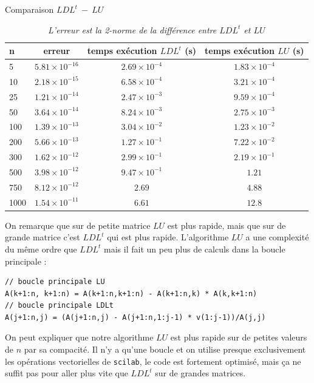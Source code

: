 \documentclass{article}
\begin{document}
\begin{table}[H]
\centering
\renewcommand*\arraystretch{1.3}
\caption{Comparaison \(LDL^t\ -\ LU\)}
\begin{tabular}{|l|c|c|c|}
  \hline
  n & erreur & temps exécution \(LDL^t\) (s) & temps exécution \(LU\) (s) \\
  \hline
	5	&	\(5.81 \times 10^{-16}\)	&	\(2.69 \times 10^{-4}\)	&	\(1.83 \times 10^{-4}\) \\
	10	&	\(2.18 \times 10^{-15}\)	&	\(6.58 \times 10^{-4}\)	&	\(3.21 \times 10^{-4}\) \\
	25	&	\(1.21 \times 10^{-14}\)	&	\(2.47 \times 10^{-3}\)	&	\(9.59 \times 10^{-4}\) \\
	50	&	\(3.64 \times 10^{-14}\)	&	\(8.24 \times 10^{-3}\)	&	\(2.75 \times 10^{-3}\) \\
	100	&	\(1.39 \times 10^{-13}\)	&	\(3.04 \times 10^{-2}\)	&	\(1.23 \times 10^{-2}\) \\
	200	&	\(5.66 \times 10^{-13}\)	&	\(1.27 \times 10^{-1}\)	&	\(7.22 \times 10^{-2}\) \\
	300	&	\(1.62 \times 10^{-12}\)	&	\(2.99 \times 10^{-1}\)	&	\(2.19 \times 10^{-1}\) \\
	500	&	\(3.98 \times 10^{-12}\)	&	\(9.47 \times 10^{-1}\)	&	\(1.21\) \\
	750	&	\(8.12 \times 10^{-12}\)	&	\(2.69\)				&	\(4.88\) \\
	1000 &	\(1.54 \times 10^{-11}\)	&	\(6.61\) 				&	\(12.8\) \\
  \hline
\end{tabular}
\caption*{\textit{L'erreur est la 2-norme de la différence entre \(LDL^t\) et \(LU\)}}
\end{table}

On remarque que sur de petite matrice \(LU\) est plus rapide, mais que sur de grande matrice c'est \(LDL^t\) qui est plus rapide. L'algorithme \(LU\) a une complexité du même ordre que \(LDL^t\) mais il fait un peu plus de calculs dans la boucle principale :  \begin{verbatim}
// boucle principale LU
A(k+1:n, k+1:n) = A(k+1:n,k+1:n) - A(k+1:n,k) * A(k,k+1:n)
// boucle principale LDLt
A(j+1:n,j) = (A(j+1:n,j) - A(j+1:n,1:j-1) * v(1:j-1))/A(j,j)
\end{verbatim}
On peut expliquer que notre algorithme \(LU\) est plus rapide sur de petites valeurs de \(n\) par sa compacité. Il n'y a qu'une boucle et on utilise presque exclusivement les opérations vectorielles de \texttt{scilab}, le code est fortement optimisé, mais ça ne suffit pas pour aller plus vite que \(LDL^t\) sur de grandes matrices.
\end{document}
